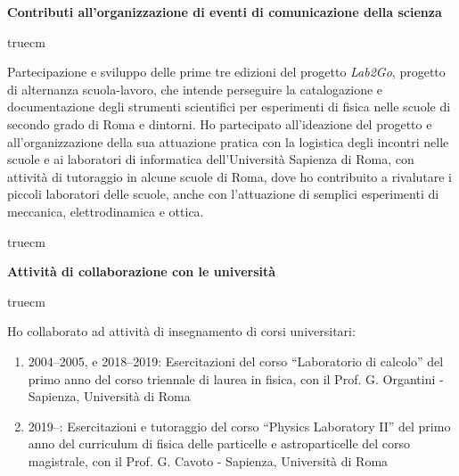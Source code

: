 \documentclass[11pt,twoside,a4paper]{article}
\begin{document}
\begin{center}
\textbf{Contributi all’organizzazione di eventi di comunicazione della scienza}
\end{center}
 truecm

Partecipazione e sviluppo delle prime tre edizioni del progetto
\textit{Lab2Go}, progetto di alternanza scuola-lavoro, che intende
perseguire la catalogazione e documentazione degli strumenti
scientifici per esperimenti di fisica nelle scuole di secondo grado di
Roma e dintorni. Ho partecipato all'ideazione del progetto e
all'organizzazione della sua attuazione pratica con la logistica degli
incontri nelle scuole e ai laboratori di informatica dell'Universit\`a
Sapienza di Roma, con attivit\`a di tutoraggio in alcune scuole di
Roma, dove ho contribuito a rivalutare i piccoli laboratori delle
scuole, anche con l'attuazione di semplici esperimenti di meccanica,
elettrodinamica e ottica.

 truecm
\begin{center}
\textbf{Attivit\`a di collaborazione con le universit\`a}
\end{center}
 truecm

Ho collaborato ad attivit\`a di insegnamento di corsi universitari:
\begin{enumerate}
\item 2004--2005, e 2018--2019: Esercitazioni del corso ``Laboratorio
  di calcolo'' del primo anno del corso triennale di laurea in fisica,
  con il Prof. G. Organtini - Sapienza, Universit\`a di Roma
\item 2019--: Esercitazioni e tutoraggio del corso ``Physics
  Laboratory II'' del primo anno del curriculum di fisica delle
  particelle e astroparticelle del corso magistrale, con il
  Prof. G. Cavoto - Sapienza, Universit\`a di Roma
\end{enumerate}
\end{document}
